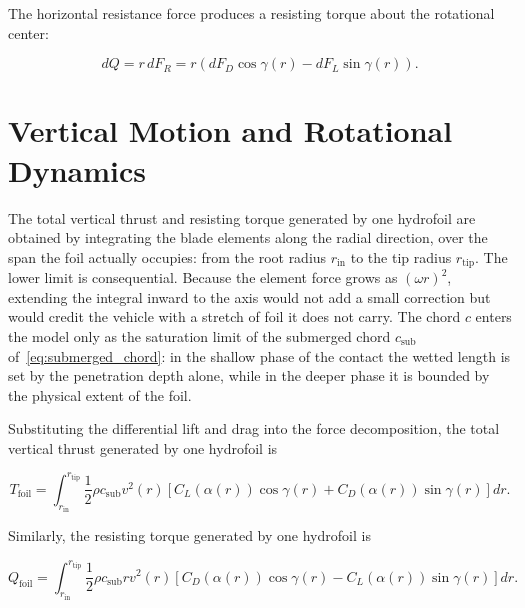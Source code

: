 The horizontal resistance force produces a resisting torque about the rotational center:

\begin{equation}
    dQ = r\,dF_R
    =
    r\left(dF_D \cos{\gamma(r)} - dF_L \sin{\gamma(r)}\right).
    \label{eq:differential_torque}
\end{equation}


\section{Vertical Motion and Rotational Dynamics}
\label{sec:vertical_rotational}

The total vertical thrust and resisting torque generated by one hydrofoil are obtained by integrating the blade elements along the radial direction, over the span the foil actually occupies: from the root radius $r_{\mathrm{in}}$ to the tip radius $r_{\mathrm{tip}}$. The lower limit is consequential. Because the element force grows as $(\omega r)^2$, extending the integral inward to the axis would not add a small correction but would credit the vehicle with a stretch of foil it does not carry. The chord $c$ enters the model only as the saturation limit of the submerged chord $c_{\mathrm{sub}}$ of~\eqref{eq:submerged_chord}: in the shallow phase of the contact the wetted length is set by the penetration depth alone, while in the deeper phase it is bounded by the physical extent of the foil.

Substituting the differential lift and drag into the force decomposition, the total vertical thrust generated by one hydrofoil is

\begin{equation}
    T_{\mathrm{foil}}
    =
    \int_{r_{\mathrm{in}}}^{r_{\mathrm{tip}}}
    \frac{1}{2}\rho c_{\mathrm{sub}} v^2(r)
    \left[
    C_L(\alpha(r))\cos{\gamma(r)}
    +
    C_D(\alpha(r))\sin{\gamma(r)}
    \right] dr .
    \label{eq:total_thrust_c}
\end{equation}

Similarly, the resisting torque generated by one hydrofoil is

\begin{equation}
    Q_{\mathrm{foil}}
    =
    \int_{r_{\mathrm{in}}}^{r_{\mathrm{tip}}}
    \frac{1}{2}\rho c_{\mathrm{sub}} r v^2(r)
    \left[
    C_D(\alpha(r))\cos{\gamma(r)}
    -
    C_L(\alpha(r))\sin{\gamma(r)}
    \right] dr .
    \label{eq:total_torque_c}
\end{equation}

